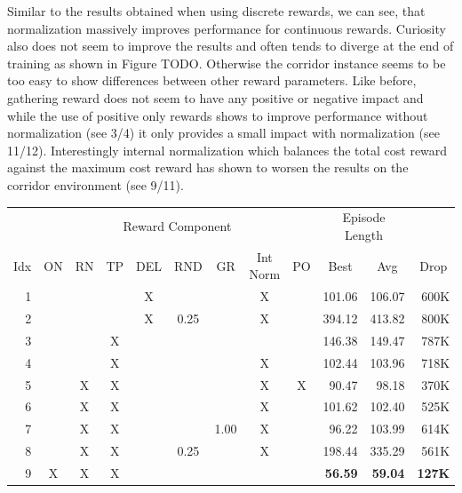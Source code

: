 Similar to the results obtained when using discrete rewards, we can see, that normalization massively improves performance for continuous rewards. Curiosity also does not seem to improve the results and often tends to diverge at the end of training as shown in Figure TODO. Otherwise the corridor instance seems to be too easy to show differences between other reward parameters. Like before, gathering reward does not seem to have any positive or negative impact and while the use of positive only rewards shows to improve performance without normalization (see 3/4) it only provides a small impact with normalization (see 11/12). Interestingly internal normalization which balances the total cost reward against the maximum cost reward has shown to worsen the results on the corridor environment (see 9/11). 


\begin{table}[htp]
    \begin{center}
        \begin{tabular}{rccccccccrrr}
            \toprule
             & \multicolumn{8}{c}{Reward Component} & \multicolumn{2}{c}{Episode Length} & \\
            \cmidrule(lr){2-9}\cmidrule(lr){10-11}
            \multicolumn{1}{c}{Idx} & \multicolumn{1}{c}{ON} & \multicolumn{1}{c}{RN} & \multicolumn{1}{c}{TP} & \multicolumn{1}{c}{DEL} & \multicolumn{1}{c}{RND} & \multicolumn{1}{c}{GR} & \multicolumn{1}{c}{Int Norm} & \multicolumn{1}{c}{PO} & \multicolumn{1}{c}{Best} & \multicolumn{1}{c}{Avg} & \multicolumn{1}{c}{Drop}\\
            \midrule
            1 &  &  &  & X &  &  & X &  & 101.06 & 106.07 & 600K \\
            2 &  &  &  & X & 0.25 &  & X &  & 394.12 & 413.82 & 800K \\
            3 &  &  & X &  &  &  &  &  & 146.38 & 149.47 & 787K \\
            4 &  &  & X &  &  &  & X &  & 102.44 & 103.96 & 718K \\
            5 &  & X & X &  &  &  & X & X & 90.47 & 98.18 & 370K \\
            6 &  & X & X &  &  &  & X &  & 101.62 & 102.40 & 525K \\
            7 &  & X & X &  &  & 1.00 & X &  & 96.22 & 103.99 & 614K \\
            8 &  & X & X &  & 0.25 &  & X &  & 198.44 & 335.29 & 561K \\
            9 & X & X & X &  &  &  &  &  & \textbf{56.59} & \textbf{59.04} & \textbf{127K} \\

\end{tabular}
\end{center}
\end{table}
